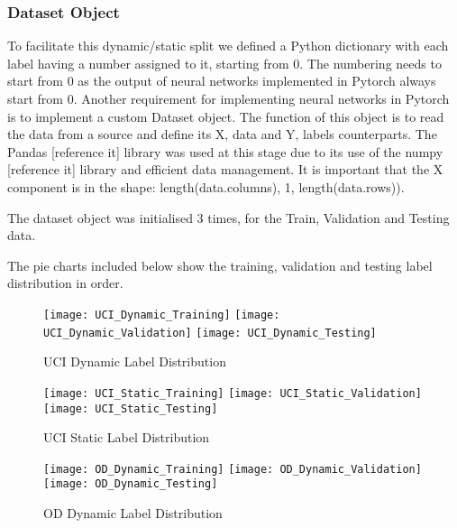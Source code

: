     \subsubsection{Dataset Object}
        To facilitate this dynamic/static split we defined a Python dictionary with each label having a number assigned to it, starting from 0.
        The numbering needs to start from 0 as the output of neural networks implemented in Pytorch always start from 0.
        Another requirement for implementing neural networks in Pytorch is to implement a custom Dataset object.
        The function of this object is to read the data from a source and define its X, data and Y, labels counterparts.
        The Pandas [reference it] library was used at this stage due to its use of the numpy [reference it] library and efficient data management.
        It is important that the X component is in the shape: length(data.columns), 1, length(data.rows)).

        The dataset object was initialised 3 times, for the Train, Validation and Testing data.

        The pie charts included below show the training, validation and testing label distribution in order.

        \begin{figure}[htp]
        \centering
        \texttt{[image: UCI\_Dynamic\_Training]}\hfill
        \texttt{[image: UCI\_Dynamic\_Validation]}\hfill
        \texttt{[image: UCI\_Dynamic\_Testing]}
        \caption{UCI Dynamic Label Distribution}
        \label{fig:figureX}
        \end{figure}

        \begin{figure}[htp]
        \centering
        \texttt{[image: UCI\_Static\_Training]}\hfill
        \texttt{[image: UCI\_Static\_Validation]}\hfill
        \texttt{[image: UCI\_Static\_Testing]}
        \caption{UCI Static Label Distribution}
        \label{fig:figureX}
        \end{figure}

        \begin{figure}[htp]
        \centering
        \texttt{[image: OD\_Dynamic\_Training]}\hfill
        \texttt{[image: OD\_Dynamic\_Validation]}\hfill
        \texttt{[image: OD\_Dynamic\_Testing]}
        \caption{OD Dynamic Label Distribution}
        \label{fig:figureX}
        \end{figure}

